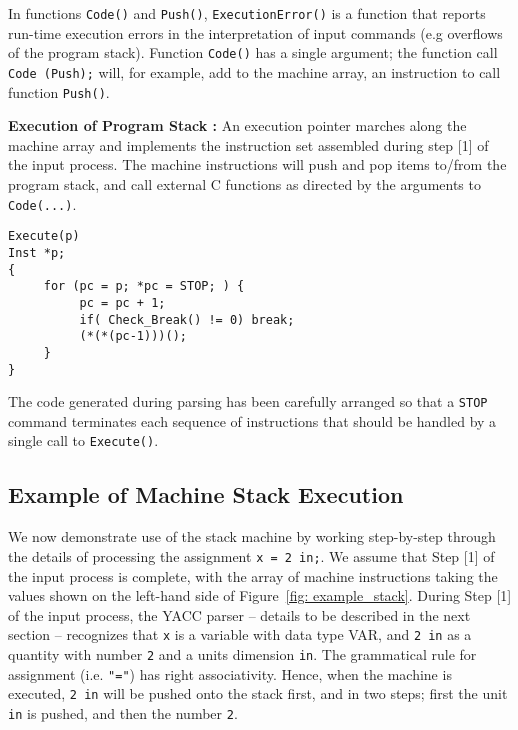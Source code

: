 \vspace{0.05 in}\noindent
In functions {\tt Code()} and {\tt Push()}, 
{\tt ExecutionError()} is a function that reports run-time execution errors
in the interpretation of input commands (e.g overflows of the program stack).
Function {\tt Code()} has a single argument;
the function call {\tt Code (Push);} will, for example,
add to the machine array, an instruction to call function {\tt Push()}.

\vspace{0.15 in}\noindent
{\bf Execution of Program Stack :}
An execution pointer marches along the machine array and implements the
instruction set assembled during step [1] of the input process.
The machine instructions will push and pop
items to/from the program stack, and call external C functions 
as directed by the arguments to {\tt Code(...)}.

\begin{footnotesize}
\begin{verbatim}
Execute(p)
Inst *p;
{
     for (pc = p; *pc = STOP; ) {
          pc = pc + 1;
          if( Check_Break() != 0) break;
          (*(*(pc-1)))();
     }
} 
\end{verbatim}
\end{footnotesize}

\vspace{0.05 in}\noindent
The code generated during parsing has been carefully
arranged so that a {\tt STOP} command terminates each sequence
of instructions that should be handled by a single call to {\tt Execute()}.

\subsection{Example of Machine Stack Execution}

\vspace{0.15 in}
\noindent\hspace{0.5 in}
We now demonstrate use of the stack machine by working step-by-step through the
details of processing the assignment {\tt x = 2 in;}. We assume that Step [1] of
the input process is complete, with the array of machine instructions
taking the values shown on the left-hand side of Figure~\ref{fig: example_stack}.
During Step [1] of the input process, the YACC parser -- details to be described
in the next section -- recognizes that {\tt x} is a variable with data type VAR,
and {\tt 2 in} as a quantity with number {\tt 2} and a units dimension {\tt in}.
The grammatical rule for assignment (i.e. {\tt "="}) has right associativity.
Hence, when the machine is executed, {\tt 2 in} will be pushed onto the stack first,
and in two steps; first the unit {\tt in} is pushed, and then the number {\tt 2}.

